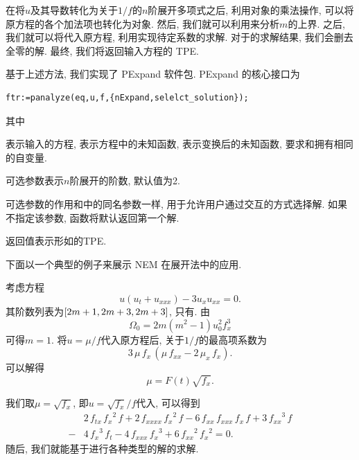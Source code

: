 在将$u$及其导数转化为关于$1/f$的$n$阶展开多项式之后, 利用对象的乘法操作, 可以将原方程的各个加法项也转化为对象. 然后, 我们就可以利用来分析$m$的上界. 之后, 我们就可以将代入原方程, 利用实现待定系数的求解. 对于的求解结果, 我们会删去全零的解. 最终, 我们将返回输入方程的 TPE. 

基于上述方法, 我们实现了 PExpand 软件包. PExpand 的核心接口为
\begin{verbatim}
ftr:=panalyze(eq,u,f,{nExpand,selelct_solution});
\end{verbatim}
其中
\begin{compactitem}[\textbullet]
\item {}表示输入的方程, 表示方程中的未知函数, 表示变换后的未知函数, 要求和拥有相同的自变量.
\item 可选参数表示$n$阶展开的阶数, 默认值为2.
\item 可选参数的作用和中的同名参数一样, 用于允许用户通过交互的方式选择解. 如果不指定该参数, 函数将默认返回第一个解. 
\item 返回值表示形如的TPE. 
\end{compactitem}

下面以一个典型的例子来展示 NEM 在\Painleve{}展开法中的应用.

\begin{example}
考虑方程
\begin{equation}
    u(u_t+u_{xxx})-3u_x u_{xx}=0. \label{pseq}
\end{equation}
其阶数列表为$\left[2m+1,2m+3,2m+3\right]$, 只有\BPthree{}. 由
\begin{equation}
    \Omega_0=2m(m^2-1)u_0^2f_x^3
\end{equation}
可得$m=1$. 将$u=\mu/f$代入原方程后, 关于$1/f$的最高项系数为
\begin{equation}
    3\,\mu\,{{f}_{x}}\,\left( \mu\,{{f}_{xx}}-2\,{{\mu}_{x}}\,{{f}_{x}}\right) .
\end{equation}
可以解得 
\begin{equation}
    \mu=F(t)\sqrt{f_x}.
\end{equation}
\end{example}
我们取$\mu=\sqrt{f_x}$, 即$u=\sqrt{f_x}/f$代入, 可以得到
\begin{equation}
\begin{aligned}
& 2\,{{f}_{tx}}\,{{{f}_{x}}}^{2}\,f+2\,{{f}_{xxxx}}\,{{{f}_{x}}}^{2}\,f-6\,{{f}_{xx}}\,{{f}_{xxx}}\,{{f}_{x}}\,f+3\,{{{f}_{xx}}}^{3}\,f \\
-&4\,{{{f}_{x}}}^{3}\,{{f}_{t}}-4\,{{f}_{xxx}}\,{{{f}_{x}}}^{3}+6\,{{{f}_{xx}}}^{2}\,{{{f}_{x}}}^{2}=0.
\end{aligned} \label{pseq-f}
\end{equation}
随后, 我们就能基于进行各种类型的解的求解.

